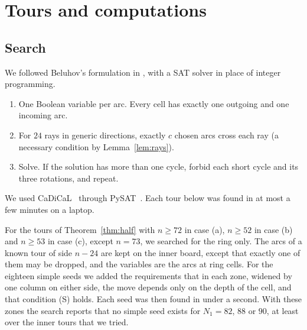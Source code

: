 \documentclass[11pt]{amsart}
\theoremstyle{remark}
\begin{document}
\section{Tours and computations}\label{sec:comp}

\subsection*{Search}
We followed Beluhov's formulation in \cite[answer 231]{knuth}, with a SAT solver in place of integer programming.
\begin{enumerate}
\item One Boolean variable per arc. Every cell has exactly one outgoing and one incoming arc.
\item For $24$ rays in generic directions, exactly $c$ chosen arcs cross each ray (a necessary condition by
Lemma~\ref{lem:rays}).
\item Solve. If the solution has more than one cycle, forbid each short cycle and its three rotations, and repeat.
\end{enumerate}
We used CaDiCaL~\cite{cadical} through PySAT~\cite{pysat}. Each tour below was found in at most a few minutes on a
laptop.

For the tours of Theorem~\ref{thm:half} with $n\ge72$ in case (a), $n\ge52$ in case (b) and $n\ge53$ in case (c),
except $n=73$, we searched for the ring only. The arcs of a known tour of side $n-24$ are kept on the inner board, except that exactly one of them may
be dropped, and the variables are the arcs at ring cells. For the eighteen simple seeds we added the requirements that in each zone, widened by one column on either side, the move depends
only on the depth of the cell, and that condition (S) holds. Each seed was then found in under a second. With
these zones the search reports that no simple seed exists for $N_1=82$, $88$ or $90$, at least over the inner tours that we
tried.
\end{document}
